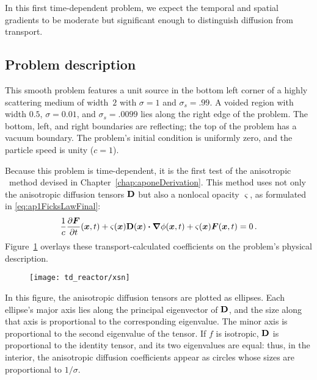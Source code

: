 In this first time-dependent problem, we expect the temporal and spatial
gradients to be moderate but significant enough to distinguish diffusion from
transport.

\subsection{Problem description}

This smooth problem features a unit source in the bottom left corner of a
highly scattering medium of width~$2$ with
$\sigma=1$ and $\sigma_s=.99$. A voided region with width $0.5$,
$\sigma=0.01$, and $\sigma_s=.0099$ lies along the right edge of the problem.
The bottom,
left, and right boundaries are reflecting; the top of the problem has a vacuum
boundary. The problem's initial condition is uniformly zero, and the particle
speed is unity ($c=1$).

Because this problem is time-dependent, it is the first test of the anisotropic
\Pone\ method devised in Chapter~\ref{chap:aponeDerivation}. This method
uses not only the anisotropic diffusion tensors $\mathbf{D}$ but also a nonlocal
opacity $\varsigma$, as formulated in \eqref{eq:ap1FicksLawFinal}:
\begin{equation*}
  \frac{1}{c}\frac{\partial \bm{F}}{\partial t}(\bm{x},t)
  + \varsigma(\bm{x}) \mathbf{D}(\bm{x}) \bm{\cdot} \bm{\nabla} \phi(\bm{x}, t)
  + \varsigma(\bm{x})\bm{F}(\bm{x},t) 
  = 0 \,.
\end{equation*}
Figure~\ref{fig:tdReactorProblem} overlays these transport-calculated
coefficients on the problem's physical description.

\begin{figure}[htb]
  \centering
  \texttt{[image: td\_reactor/xsn]}
  \label{fig:tdReactorProblem}
\end{figure}

In this figure, the anisotropic diffusion tensors are plotted as ellipses. Each
ellipse's major axis
lies along the principal eigenvector of $\mathbf{D}$, and the size along that axis is
proportional to the corresponding eigenvalue. The minor axis is proportional to
the second eigenvalue of the tensor. If $f$ is isotropic, $\mathbf{D}$ is
proportional to the identity tensor, and its two eigenvalues are equal: thus, in
the interior, the anisotropic diffusion coefficients appear as circles whose
sizes are proportional to $1/\sigma$.


